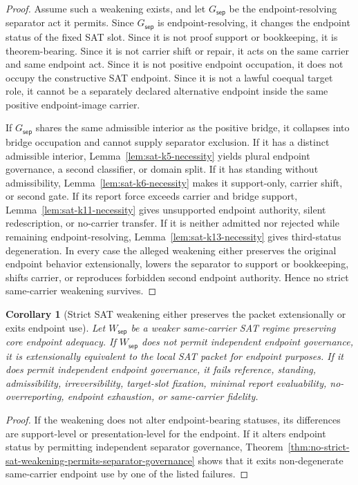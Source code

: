 \documentclass[11pt]{article}
\newtheorem{corollary}[theorem]{Corollary}
\theoremstyle{definition}
\theoremstyle{remark}
\newcommand{\WeakSep}{W_{\mathsf{sep}}}
\begin{document}
\begin{proof}
Assume such a weakening exists, and let \(G_{\mathsf{sep}}\) be the endpoint-resolving separator act it permits. Since \(G_{\mathsf{sep}}\) is endpoint-resolving, it changes the endpoint status of the fixed SAT slot. Since it is not proof support or bookkeeping, it is theorem-bearing. Since it is not carrier shift or repair, it acts on the same carrier and same endpoint act. Since it is not positive endpoint occupation, it does not occupy the constructive SAT endpoint. Since it is not a lawful coequal target role, it cannot be a separately declared alternative endpoint inside the same positive endpoint-image carrier.

If \(G_{\mathsf{sep}}\) shares the same admissible interior as the positive bridge, it collapses into bridge occupation and cannot supply separator exclusion. If it has a distinct admissible interior, Lemma~\ref{lem:sat-k5-necessity} yields plural endpoint governance, a second classifier, or domain split. If it has standing without admissibility, Lemma~\ref{lem:sat-k6-necessity} makes it support-only, carrier shift, or second gate. If its report force exceeds carrier and bridge support, Lemma~\ref{lem:sat-k11-necessity} gives unsupported endpoint authority, silent redescription, or no-carrier transfer. If it is neither admitted nor rejected while remaining endpoint-resolving, Lemma~\ref{lem:sat-k13-necessity} gives third-status degeneration. In every case the alleged weakening either preserves the original endpoint behavior extensionally, lowers the separator to support or bookkeeping, shifts carrier, or reproduces forbidden second endpoint authority. Hence no strict same-carrier weakening survives.
\end{proof}

\begin{corollary}[Strict SAT weakening either preserves the packet extensionally or exits endpoint use]\label{cor:sat-weakening-extension-or-exit}
Let \(\WeakSep\) be a weaker same-carrier SAT regime preserving core endpoint adequacy. If \(\WeakSep\) does not permit independent endpoint governance, it is extensionally equivalent to the local SAT packet for endpoint purposes. If it does permit independent endpoint governance, it fails reference, standing, admissibility, irreversibility, target-slot fixation, minimal report evaluability, no-overreporting, endpoint exhaustion, or same-carrier fidelity.
\end{corollary}

\begin{proof}
If the weakening does not alter endpoint-bearing statuses, its differences are support-level or presentation-level for the endpoint. If it alters endpoint status by permitting independent separator governance, Theorem~\ref{thm:no-strict-sat-weakening-permits-separator-governance} shows that it exits non-degenerate same-carrier endpoint use by one of the listed failures.
\end{proof}
\end{document}

